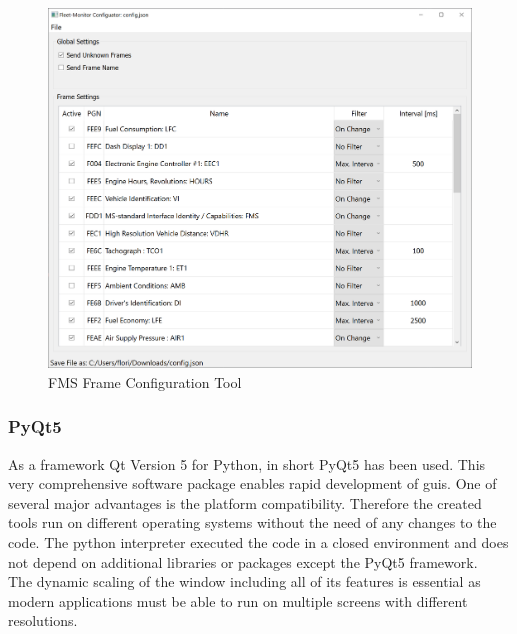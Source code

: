 \medskip
\begin{figure}[h!]
	\centering
	\includegraphics[width=\textwidth]{images/Configuration-Tool_Screenshot}
	\caption{FMS Frame Configuration Tool}
	\label{fig:configuration_tool}
\end{figure}
\newpage

\subsubsection{PyQt5}
As a framework Qt Version 5 for Python, in short PyQt5 has been used. This very comprehensive software package enables rapid development of \acrshort{gui}s. One of several major advantages is the platform compatibility. Therefore the created tools run on different operating systems without the need of any changes to the code. The python interpreter executed the code in a closed environment and does not depend on additional libraries or packages except the PyQt5 framework. \\
The dynamic scaling of the window including all of its features is essential as modern applications must be able to run on multiple screens with different resolutions.

